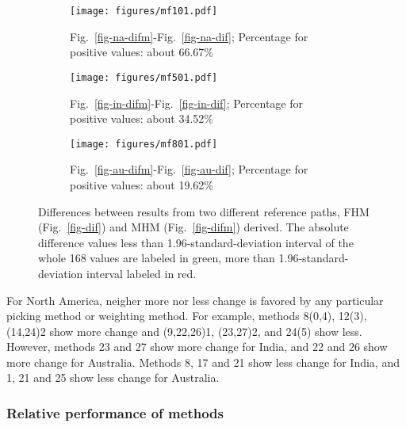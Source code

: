 \begin{figure*}
	\centering
	\begin{subfigure}{1.01\textwidth}
		\texttt{[image: figures/mf101.pdf]}
		\caption{Fig.~\ref{fig-na-difm}-Fig.~\ref{fig-na-dif}; Percentage for
		positive values: about 66.67\%}\label{fig-mf101}
	\end{subfigure}
	\vspace{.1em}
	\begin{subfigure}{1.01\textwidth}
		\texttt{[image: figures/mf501.pdf]}
		\caption{Fig.~\ref{fig-in-difm}-Fig.~\ref{fig-in-dif}; Percentage for
		positive values: about 34.52\%}\label{fig-mf501}
	\end{subfigure}
	\vspace{.1em}
	\begin{subfigure}{1.01\textwidth}
		\texttt{[image: figures/mf801.pdf]}
		\caption{Fig.~\ref{fig-au-difm}-Fig.~\ref{fig-au-dif}; Percentage for
		positive values: about 19.62\%}\label{fig-mf801}
	\end{subfigure}
	\caption[Differences between results from FHM and MHM]{Differences between
results from two different reference paths, FHM (Fig.~\ref{fig-dif}) and MHM
(Fig.~\ref{fig-difm}) derived. The absolute difference values less than
1.96-standard-deviation interval of the whole 168 values are labeled in green,
more than 1.96-standard-deviation interval labeled in red.}\label{fig-dmf}
\end{figure*}

For North America, neigher more nor less change is favored by any particular
picking method or weighting method. For example, methods 8(0,4), 12(3), (14,24)2
show more change and (9,22,26)1, (23,27)2, and 24(5) show less. However, methods
23 and 27 show more change for India, and 22 and 26 show more change for
Australia. Methods 8, 17 and 21 show less change for India, and 1, 21 and 25
show less change for Australia.

\subsubsection{Relative performance of methods}

